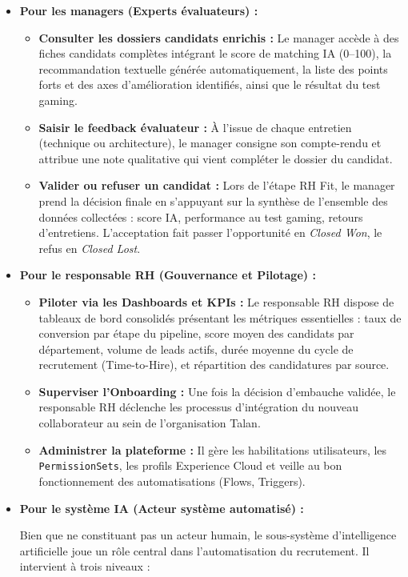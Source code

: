 \begin{itemize}
\item \textbf{Pour les managers (Experts évaluateurs) :}
\begin{itemize}
    \item \textbf{Consulter les dossiers candidats enrichis :} Le manager accède à des fiches candidats complètes intégrant le score de matching IA (0--100), la recommandation textuelle générée automatiquement, la liste des points forts et des axes d'amélioration identifiés, ainsi que le résultat du test gaming.
    \item \textbf{Saisir le feedback évaluateur :} À l'issue de chaque entretien (technique ou architecture), le manager consigne son compte-rendu et attribue une note qualitative qui vient compléter le dossier du candidat.
    \item \textbf{Valider ou refuser un candidat :} Lors de l'étape RH Fit, le manager prend la décision finale en s'appuyant sur la synthèse de l'ensemble des données collectées : score IA, performance au test gaming, retours d'entretiens. L'acceptation fait passer l'opportunité en \textit{Closed Won}, le refus en \textit{Closed Lost}.
\end{itemize}

\item \textbf{Pour le responsable RH (Gouvernance et Pilotage) :}
\begin{itemize}
    \item \textbf{Piloter via les Dashboards et KPIs :} Le responsable RH dispose de tableaux de bord consolidés présentant les métriques essentielles : taux de conversion par étape du pipeline, score moyen des candidats par département, volume de leads actifs, durée moyenne du cycle de recrutement (Time-to-Hire), et répartition des candidatures par source.
    \item \textbf{Superviser l'Onboarding :} Une fois la décision d'embauche validée, le responsable RH déclenche les processus d'intégration du nouveau collaborateur au sein de l'organisation Talan.
    \item \textbf{Administrer la plateforme :} Il gère les habilitations utilisateurs, les \texttt{PermissionSets}, les profils Experience Cloud et veille au bon fonctionnement des automatisations (Flows, Triggers).
\end{itemize}

\item \textbf{Pour le système IA (Acteur système automatisé) :}

Bien que ne constituant pas un acteur humain, le sous-système d'intelligence artificielle joue un rôle central dans l'automatisation du recrutement. Il intervient à trois niveaux :


\end{itemize}
